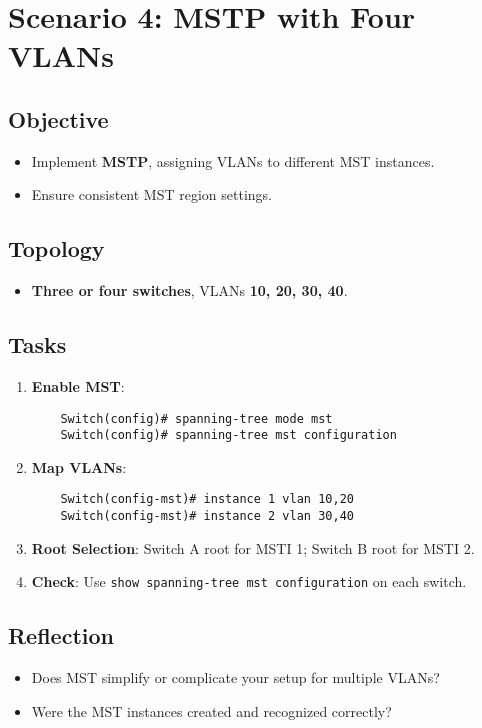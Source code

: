 \documentclass[a4paper]{report}
\begin{document}
\section{Scenario 4: MSTP with Four VLANs}
\subsection{Objective}
\begin{itemize}
    \item Implement \textbf{MSTP}, assigning VLANs to different MST instances.
    \item Ensure consistent MST region settings.
\end{itemize}

\subsection{Topology}
\begin{itemize}
    \item \textbf{Three or four switches}, VLANs \textbf{10, 20, 30, 40}.
\end{itemize}

\subsection{Tasks}
\begin{enumerate}
    \item \textbf{Enable MST}:
    \begin{lstlisting}
    Switch(config)# spanning-tree mode mst
    Switch(config)# spanning-tree mst configuration
    \end{lstlisting}
    \item \textbf{Map VLANs}:
    \begin{lstlisting}
    Switch(config-mst)# instance 1 vlan 10,20
    Switch(config-mst)# instance 2 vlan 30,40
    \end{lstlisting}
    \item \textbf{Root Selection}: Switch A root for MSTI 1; Switch B root for MSTI 2.
    \item \textbf{Check}: Use \texttt{show spanning-tree mst configuration} on each switch.
\end{enumerate}

\subsection{Reflection}
\begin{itemize}
    \item Does MST simplify or complicate your setup for multiple VLANs?
    \item Were the MST instances created and recognized correctly?
\end{itemize}
\end{document}
